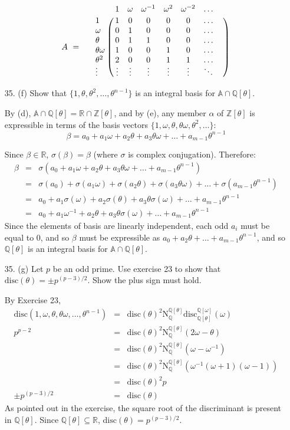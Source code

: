 \documentclass{article}
\newcommand{\w}[0]{\omega}
\newcommand{\Q}[0]{\mathbb{Q}}
\newcommand{\R}[0]{\mathbb{R}}
\newcommand{\Z}[0]{\mathbb{Z}}
\newcommand{\norm}[0]{\text{N}}
\newcommand{\disc}[1]{\text{disc}(#1)}
\begin{document}
\begin{enumerate}
\[
    A\ =\hspace{5mm}
    \bordermatrix{
             & 1 & \w& \w^{-1} & \w^2 & \w^{-2} & \ldots \cr
    1        & 1 &  0  & 0 & 0 & 0 & \ldots \cr
    \w       &  0  & 1 & 0 & 0 & 0 & \ldots \cr
    \theta   &  0  & 1 & 1 & 0 & 0 & \ldots \cr
    \theta\w &  1  & 0 & 0 & 1 & 0 & \ldots \cr
    \theta^2 &  2  & 0 & 0 & 1 & 1 & \ldots \cr
    \vdots   & \vdots & \vdots & \vdots & \vdots & \vdots & \ddots & \cr
    }
\]

\item[35. (f)] Show that $\{ 1, \theta, \theta^2, \ldots, \theta^{n-1} \}$ is an integral basis for $\mathbb{A} \cap \Q[\theta]$.

By (d), $\mathbb{A} \cap \Q[\theta] = \R \cap \Z[\theta]$, and by (e), any member $\alpha$ of $\Z[\theta]$ is expressible in terms of the basis vectors $\{ 1, \w, \theta, \theta\w, \theta^2, \ldots \}$:
\[ \beta = a_0 + a_1 \w + a_2 \theta + a_3 \theta \w + \ldots + a_{m-1} \theta^{n-1} \]

Since $\beta \in \mathbb{R}$, $\sigma(\beta) = \beta$ (where $\sigma$ is complex conjugation).  Therefore:
\begin{eqnarray*}
\beta &=& \sigma(a_0 + a_1 \w + a_2 \theta + a_3 \theta\omega + \ldots + a_{m-1}\theta^{n-1})\\
    &=& \sigma(a_0) + \sigma(a_1 \w) + \sigma(a_2 \theta) + \sigma(a_3 \theta\omega) + \ldots + \sigma(a_{m-1}\theta^{n-1}) \\
    &=& a_0 + a_1 \sigma(\w) + a_2 \sigma(\theta) + a_3 \theta\sigma(\omega) + \ldots + a_{m-1}\theta^{n-1} \\
    &=& a_0 + a_1 \w^{-1}+ a_2 \theta + a_3 \theta\sigma(\omega) + \ldots + a_{m-1}\theta^{n-1}
\end{eqnarray*}
Since the elements of basis are linearly independent, each odd $a_{i}$ must be equal to 0, and so $\beta$ must be expressible as $a_0 + a_2\theta + \ldots + a_{m-1}\theta^{n-1}$, and so $\Q[\theta]$ is an integral basis for $\mathbb{A} \cap \Q[\theta]$.

\item[35. (g)] Let $p$ be an odd prime.  Use exercise 23 to show that $\disc{\theta} = \pm p^{(p-3)/2}$.  Show the plus sign must hold.

By Exercise 23,
\begin{eqnarray*}
\disc{1, \w, \theta, \theta\w, \ldots, \theta^{n-1}} &=&
    \disc{\theta}^2 \norm^{\Q[\theta]}_{\Q} \text{disc}^{\Q[\w]}_{\Q[\theta]}(\w) \\
    p^{p - 2} &=& \disc{\theta}^2 \norm^{\Q[\theta]}_{\Q} (2\w - \theta) \\
    &=& \disc{\theta}^2 \norm^{\Q[\theta]}_{\Q} (\w - \w^{-1}) \\
    &=& \disc{\theta}^2 \norm^{\Q[\theta]}_{\Q} (\w^{-1}(\w + 1 )(\w - 1))\\
    &=& \disc{\theta}^2 p\\
    \pm p^{(p - 3)/2} &=& \disc{\theta}
\end{eqnarray*}
As pointed out in the exercise, the square root of the discriminant is present in $\Q[\theta]$.  Since $\Q[\theta] \subseteq \R$, $\disc{\theta} = p^{(p-3)/2}$.


\end{enumerate}
\end{document}
